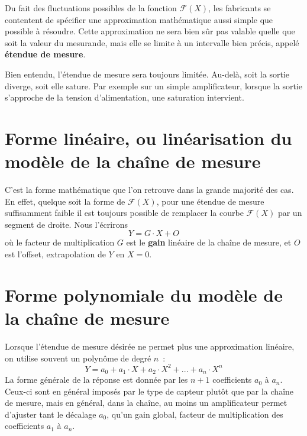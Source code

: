 Du fait des fluctuations possibles de la fonction $\mathcal{F}(X)$, les fabricants se contentent de spécifier une approximation mathématique aussi simple que possible à résoudre. Cette approximation ne sera bien sûr pas valable quelle que soit la valeur du mesurande, mais elle se limite à un intervalle bien précis, appelé \textbf{étendue de mesure}.
\begin{center}
\end{center}
Bien entendu, l'étendue de mesure sera toujours limitée. Au-delà, soit la sortie diverge, soit elle sature. Par exemple sur un simple amplificateur, lorsque la sortie s'approche de la tension d'alimentation, une saturation intervient.

\section{Forme linéaire, ou linéarisation du modèle de la chaîne de mesure}

C'est la forme mathématique que l'on retrouve dans la grande majorité des cas. En effet, quelque soit la forme de $\mathcal{F}(X)$, pour une étendue de mesure suffisamment faible il est toujours possible de remplacer la courbe $\mathcal{F}(X)$ par un segment de droite. Nous l'écrirons
\begin{equation}
Y = G\cdot X + O
\end{equation}
où le facteur de multiplication $G$ est le \textbf{gain} linéaire de la chaîne de mesure, et $O$ est l'offset, extrapolation de $Y$ en $X=0$.

\section{Forme polynomiale du modèle de la chaîne de mesure}

Lorsque l'étendue de mesure désirée ne permet plus une approximation linéaire, on utilise souvent un polynôme de degré $n$~:
\begin{equation}
Y = a_0 + a_1\cdot X + a_2\cdot X^2 + ... + a_n \cdot X^n
\end{equation}
La forme générale de la réponse est donnée par les $n+1$ coefficients $a_0$ à $a_n$. Ceux-ci sont en général imposés par le type de capteur plutôt que par la chaîne de mesure, mais en général, dans la chaîne, au moins un amplificateur permet d'ajuster tant le décalage $a_0$, qu'un gain global, facteur de multiplication des coefficients $a_1$ à $a_n$.

